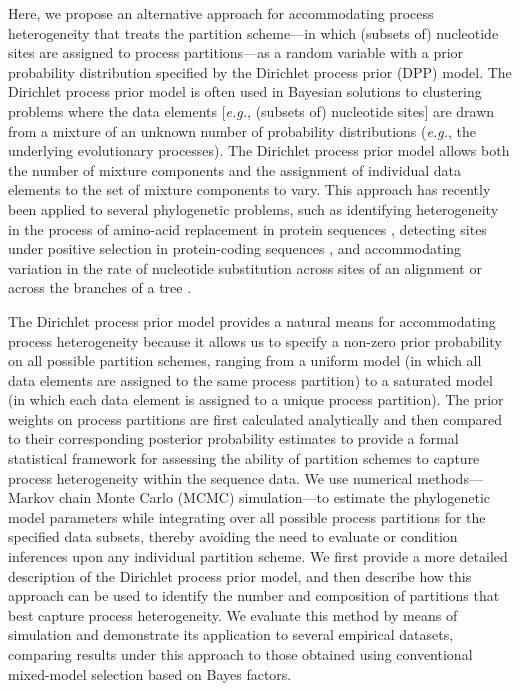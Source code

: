 \documentclass[11pt]{article}
\begin{document}
Here, we propose an alternative approach for accommodating process heterogeneity that treats the partition scheme---in which (subsets of) nucleotide sites are assigned to process partitions---as a random variable with a prior probability distribution specified by the Dirichlet process prior (DPP) model.
The Dirichlet process prior model is often used in Bayesian solutions to clustering problems where the data elements [{\it e.g.}, (subsets of) nucleotide sites] are drawn from a mixture of an unknown number of probability distributions ({\it e.g.}, the underlying evolutionary processes).
The Dirichlet process prior model allows both the number of mixture components and the assignment of individual data elements to the set of mixture components to vary.
This approach has recently been applied to several phylogenetic problems, such as identifying 
heterogeneity in the process of amino-acid replacement in protein sequences \citep{lartillot04}, detecting sites under positive selection in protein-coding sequences \citep{huelsenbeck06}, and accommodating variation in the rate of nucleotide substitution across sites of an alignment \citep{huelsenbeck07b} or across the branches of a tree \citep{heath11}.

The Dirichlet process prior model provides a natural means for accommodating process heterogeneity because it allows us to specify a non-zero prior probability on all possible partition schemes, ranging from a uniform model (in which all data elements are assigned to the same process partition) to a saturated model (in which each data element is assigned to a unique process partition).
The prior weights on process partitions are first calculated analytically and then compared to their corresponding posterior probability estimates to provide a formal statistical framework for assessing the ability of partition schemes to capture process heterogeneity within the sequence data.
We use numerical methods---Markov chain Monte Carlo (MCMC) simulation---to estimate the phylogenetic model parameters while integrating over all possible process partitions for the specified data subsets, thereby avoiding the need to evaluate or condition inferences upon any individual partition scheme. 
We first provide a more detailed description of the Dirichlet process prior model, and then describe how this approach can be used to identify the number and composition of partitions that best capture process heterogeneity.
We evaluate this method by means of simulation and demonstrate its application to several empirical datasets, comparing results under this approach to those obtained using conventional mixed-model selection based on Bayes factors.
\end{document}
